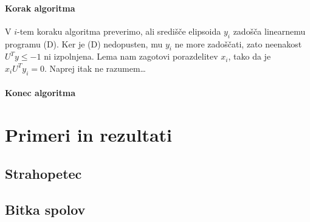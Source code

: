\documentclass{article}
\begin{document}
\paragraph*{Korak algoritma}
V $i$-tem koraku algoritma preverimo, ali središče elipsoida $y_i$ zadošča linearnemu programu (D). Ker je (D) nedopusten, mu $y_i$ ne more zadoščati, zato neenakost $U^T y \leq -1$ ni izpolnjena. Lema nam zagotovi porazdelitev $x_i$, tako da je $x_i U^T y_i = 0$. Naprej itak ne razumem\dots

\paragraph*{Konec algoritma}


\section{Primeri in rezultati}
\subsection[]{Strahopetec}
\subsection[]{Bitka spolov}
\end{document}
